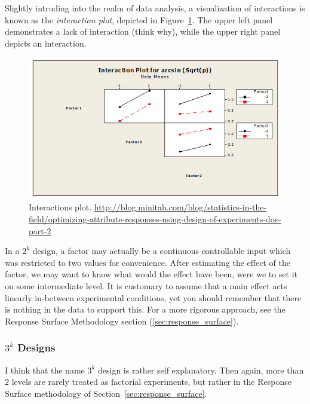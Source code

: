 Slightly intruding into the realm of data analysis, a visualization of interactions is known as the \emph{interaction plot}, depicted in Figure~\ref{fig:interaction_plot}. 
The upper left panel demonstrates a lack of interaction (think why), while the upper right panel depicts an interaction.
\begin{figure}[ht]
\centering
\includegraphics[width=0.3\textheight]{art/attribute_doe_interaction_plot}
\caption{Interactions plot. \newline \url{http://blog.minitab.com/blog/statistics-in-the-field/optimizing-attribute-responses-using-design-of-experiments-doe-part-2}}
\label{fig:interaction_plot}
\end{figure}



\begin{remark}
In a $2^k$ design, a factor may actually be a continuous controllable input which was restricted to two values for convenience. 
After estimating the effect of the factor, we may want to know what would the effect have been, were we to set it on some intermediate level.
It is customary to assume that a main effect acts linearly in-between experimental conditions, yet you should remember that there is nothing in the data to support this.
For a more rigorous approach, see the Response Surface Methodology section (\ref{sec:response_surface}).
\end{remark}



\subsubsection{$3^k$ Designs}
I think that the name $3^k$ design is rather self explanatory.
Then again, more than $2$ levels are rarely treated as factorial experiments, but rather in the Response Surface methodology of Section~\ref{sec:response_surface}.




